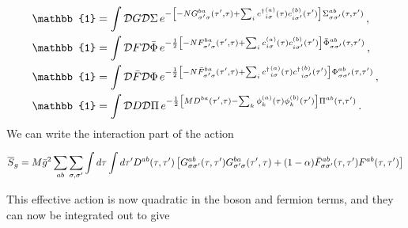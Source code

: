 \begin{subequations} 
\begin{align}
    \mathbb{1} &= \int\mathcal{D}G\mathcal{D}\Sigma\, e^{-\left[-NG^{ba}_{\sigmap\sigma}(\taup,\tau) + \sum_i\cdag{a}{i\sigma}{\tau}\cind{b}{i\sigmap}{\taup}\right]\Sigma^{ab}_{\sigma\sigmap}(\tau,\taup)} \,,\label{eq:LMGS}\\
    \mathbb{1} &= \int\mathcal{D}F\mathcal{D}\Bar{\Phi}\, e^{-\frac{1}{2}\left[-NF^{ba}_{\sigmap\sigma}(\taup,\tau) + \sum_i\cind{a}{i\sigma}{\tau}\cind{b}{i\sigmap}{\taup}\right]{\Bar{\Phi}}^{ab}_{\sigma\sigmap}(\tau,\taup)}\,,\label{eq:LMFPhib} \\
    \mathbb{1} &= \int\mathcal{D}\Bar{F}\mathcal{D}\Phi\, e^{-\frac{1}{2}\left[-N{\Bar{F}}^{ba}_{\sigmap\sigma}(\taup,\tau) + \sum_i\cdag{a}{i\sigma}{\tau}\cdag{b}{i\sigmap}{\taup}\right]{\Phi}^{ab}_{\sigma\sigmap}(\tau,\taup)} \,,\label{eq:LMFbPhi}\\
    \mathbb{1} &= \int\mathcal{D}D\mathcal{D}\Pi\, e^{-\frac{1}{2}\left[MD^{ba}(\taup,\tau) - \sum_k\phi_k^{(a)}(\tau)\phi^{(b)}_{k}(\taup)\right]\Pi^{ab}(\tau,\taup)} \,. \label{eq:LMDPi}
\end{align}
\end{subequations}
%
We can write the interaction part of the action 
\begin{widetext}
\begin{align}
    \overline{S}_g = M\bar{g}^2\sum_{ab}\sum_{\sigma,\sigma^\prime}\int d\tau \int d\tau^\prime D^{ab}(\tau,\tau^\prime)\left[G^{ab}_{\sigma\sigma^\prime}(\tau,\tau^\prime)G^{ba}_{\sigma^\prime\sigma}(\tau^\prime,\tau) + (1-\alpha)\Bar{F}^{ab}_{\sigma\sigma^\prime}(\tau,\tau^\prime)F^{ab}(\tau,\tau^\prime)\right] 
\end{align}
\end{widetext}
%
This effective action is now quadratic in the boson and fermion terms, and they can now be integrated out to give
%
